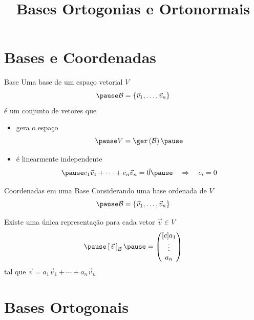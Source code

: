 \documentclass[fleqn,aspectratio=169,12pt]{beamer}
\title{Bases Ortogonias e Ortonormais}
\begin{document}
\addtitle

\section{Bases e Coordenadas}

\begin{frame}{Base}
  Uma base de um espaço vetorial $V$
  \[
    \pause
    \mathcal{B} = \{\vec{v}_1,\ldots,\vec{v}_n\}
  \]
  \pause
  é um conjunto de vetores que
  \pause
  \begin{itemize}
    \item gera o espaço
      \[
        \pause
        V = \ger\left(\mathcal{B}\right)
        \pause
      \]
    \item é linearmente independente
      \[
        \pause
        c_1\vec{v}_1+\cdots+c_n\vec{v}_n = \vec{0}
        \pause
        \quad\Rightarrow\quad
        c_i = 0
      \]
  \end{itemize}
\end{frame}

\begin{frame}{Coordenadas em uma Base}
  Considerando uma base ordenada de $V$
  \[
    \pause
    \mathcal{B} = \{\vec{v}_1,\ldots,\vec{v}_n\}
  \]

  \pause
  Existe uma única representação para cada vetor \(\vec{v}\in V\)
  \[
    \pause
    \left[\,\vec{v}\,\right]_{\mathcal{B}}
    \pause =
    \begin{pmatrix}[c]
      a_{1}  \\
      \vdots \\
      a_{n}
    \end{pmatrix}
  \]
  \pause
  tal que
  \(
    \vec{v} = a_1\vec{v}_1 + \cdots + a_n\vec{v}_n
  \)
\end{frame}

\section{Bases Ortogonais}
\end{document}
